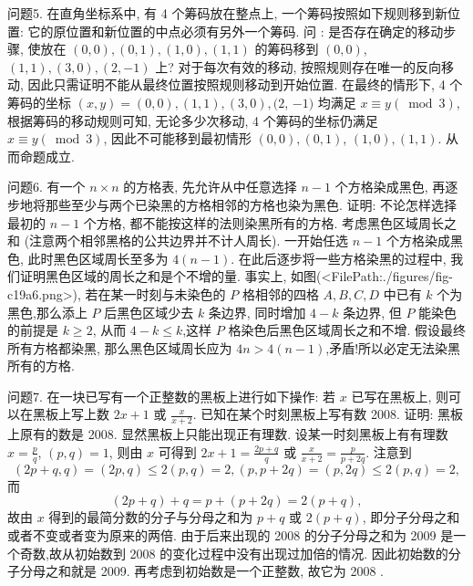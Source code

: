 问题5. 在直角坐标系中, 有 4 个筹码放在整点上, 一个筹码按照如下规则移到新位置: 它的原位置和新位置的中点必须有另外一个筹码.
问 : 是否存在确定的移动步骤, 使放在 $(0,0),(0,1),(1,0),(1,1)$ 的筹码移到 $(0,0)$, $(1,1),(3,0),(2,-1)$ 上?
对于每次有效的移动, 按照规则存在唯一的反向移动, 因此只需证明不能从最终位置按照规则移动到开始位置.
在最终的情形下, 4 个筹码的坐标 $(x, y)=(0,0),(1,1),(3,0),(2$, $-1)$ 均满足 $x \equiv y(\bmod 3)$, 根据筹码的移动规则可知, 无论多少次移动, 4 个筹码的坐标仍满足 $x \equiv y(\bmod 3)$, 因此不可能移到最初情形 $(0,0),(0,1)$, $(1,0),(1,1)$. 从而命题成立.



问题6. 有一个 $n \times n$ 的方格表, 先允许从中任意选择 $n-1$ 个方格染成黑色, 再逐步地将那些至少与两个已染黑的方格相邻的方格也染为黑色.
证明: 不论怎样选择最初的 $n-1$ 个方格, 都不能按这样的法则染黑所有的方格.
考虑黑色区域周长之和 (注意两个相邻黑格的公共边界并不计人周长).
一开始任选 $n-1$ 个方格染成黑色, 此时黑色区域周长至多为 $4(n-1)$. 在此后逐步将一些方格染黑的过程中, 我们证明黑色区域的周长之和是个不增的量.
事实上, 如图(<FilePath:./figures/fig-c19a6.png>), 若在某一时刻与未染色的 $P$ 格相邻的四格 $A, B, C, D$ 中已有 $k$ 个为黑色,那么添上 $P$ 后黑色区域少去 $k$ 条边界, 同时增加 $4-k$ 条边界, 但 $P$ 能染色的前提是 $k \geqslant 2$, 从而 $4-k \leqslant k$,这样 $P$ 格染色后黑色区域周长之和不增.
假设最终所有方格都染黑, 那么黑色区域周长应为 $4 n> 4(n-1)$,矛盾!所以必定无法染黑所有的方格.



问题7. 在一块已写有一个正整数的黑板上进行如下操作: 若 $x$ 已写在黑板上, 则可以在黑板上写上数 $2 x+1$ 或 $\frac{x}{x+2}$. 已知在某个时刻黑板上写有数 2008. 证明: 黑板上原有的数是 2008. 
显然黑板上只能出现正有理数.
设某一时刻黑板上有有理数 $x=\frac{p}{q}$, $(p, q)=1$, 则由 $x$ 可得到 $2 x+1=\frac{2 p+q}{q}$ 或 $\frac{x}{x+2}=\frac{p}{p+2 q}$.
注意到
$$
(2 p+q, q)=(2 p, q) \leqslant 2(p, q)=2,(p, p+2 q)=(p, 2 q) \leqslant 2(p, q)=2,
$$
而
$$
(2 p+q)+q=p+(p+2 q)=2(p+q),
$$
故由 $x$ 得到的最简分数的分子与分母之和为 $p+q$ 或 $2(p+q)$, 即分子分母之和或者不变或者变为原来的两倍.
由于后来出现的 2008 的分子分母之和为 2009 是一个奇数,故从初始数到 2008 的变化过程中没有出现过加倍的情况.
因此初始数的分子分母之和就是 2009. 再考虑到初始数是一个正整数, 故它为 2008 .




